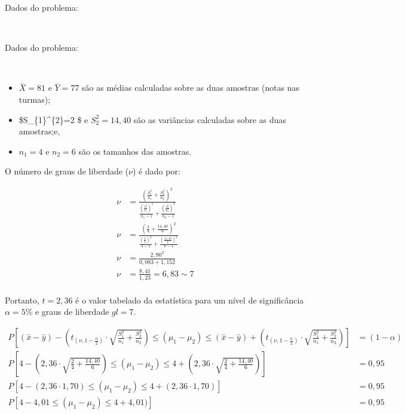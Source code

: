 \documentclass[
]{book}
\providecommand{\tightlist}{%
  \setlength{\itemsep}{0pt}\setlength{\parskip}{0pt}}
\begin{document}
\hfill\break

Dados do problema:

~

Dados do problema:

~

\begin{itemize}
\tightlist
\item
  \(\stackrel{-}{X}=81\) e \(\stackrel{-}{Y}=77\) são as médias calculadas sobre as duas amostras (notas nas turmas);\\
\item
  \$S\_\{1\}\^{}\{2\}=2 \$ e \(S_{2}^{2}= 14,40\) são as variâncias calculadas sobre as duas amostras;e,
\item
  \(n_{1} = 4\) e \(n_{2}=6\) são os tamanhos das amostras.
\end{itemize}

\hfill\break

O número de graus de liberdade (\(\nu\)) é dado por:

\hfill\break

\begin{align*}
\nu &  =  \frac{
(\frac{S^{2}_{1}}{n_{1}} +
\frac{S^{2}_{2}}{n_{2}})^{2}
}
{ 
\frac{(\frac{S^{2}_{1}}{n_{1}})^{2}}{n_{1}-1}  +
\frac{(\frac{S^{2}_{2}}{n_{2}})^{2}}{n_{2}-1}
} \\
\nu  & =  \frac{ (\frac{2}{4} + \frac{14,40}{6})^{2}}{\frac{(\frac{2}{4})^{2}}{4-1}  +
\frac{(\frac{14,40}{6})^{2}}{6-1} } \\
\nu & =  \frac{ 2,90^{2}}{0,083  + 1,152} \\
\nu & =  \frac{ 8,41}{1,23} = 6,83 \sim 7 \\
\end{align*}

\hfill\break
Portanto, \(t=2,36\) é o valor tabelado da estatística para um nível de significância \(\alpha=5\%\) e graus de liberdade \(gl=7\).

\hfill\break

\begin{align*}
P[(\stackrel{-}{x}-\stackrel{-}{y} ) -   ({t}_{( \nu, 1-\frac{\alpha }{2})} \cdot   \sqrt{\frac{S^{2}_{1}}{n_{1}} + \frac{S^{2}_{2}}{n_{2}} }  ) \le (\mu_{1}-\mu_{2}) \le (\stackrel{-}{x}-\stackrel{-}{y})   +({t}_{( \nu, 1-\frac{\alpha }{2})} \cdot  \sqrt{\frac{S^{2}_{1}}{n_{1}} + \frac{S^{2}_{2}}{n_{2}} }        )     ] & = (1-\alpha) \\
P[ 4  -   ( 2,36  \cdot   \sqrt{\frac{ 2}{4} + \frac{14,40}{6}}  ) \le (\mu_{1}-\mu_{2}) \le  4  +( 2,36  \cdot  \sqrt{\frac{ 2}{4} + \frac{14,40}{6}}        )     ] & = 0,95 \\
P[ 4  -   ( 2,36  \cdot   1,70   ) \le (\mu_{1}-\mu_{2}) \le  4  +( 2,36  \cdot  1,70   )     ] &  = 0,95 \\
P[ 4  - 4,01  \le (\mu_{1}-\mu_{2}) \le  4  + 4,01  )     ] & = 0,95 \\
\end{align*}
\end{document}
